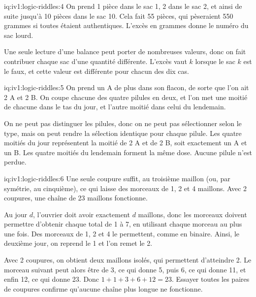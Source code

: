 \begin{solution}{iq:iv1:logic-riddles:4}
On prend 1 pièce dans le sac 1, 2 dans le sac 2, et ainsi de suite jusqu'à 10 pièces dans le sac 10. Cela fait 55 pièces, qui pèseraient 550 grammes si toutes étaient authentiques. L'excès en grammes donne le numéro du sac lourd.

Une seule lecture d'une balance peut porter de nombreuses valeurs, donc on fait contribuer chaque sac d'une quantité différente. L'excès vaut $k$ lorsque le sac $k$ est le faux, et cette valeur est différente pour chacun des dix cas.

\end{solution}

\begin{solution}{iq:iv1:logic-riddles:5}
On prend un A de plus dans son flacon, de sorte que l'on ait 2 A et 2 B. On coupe chacune des quatre pilules en deux, et l'on met une moitié de chacune dans le tas du jour, et l'autre moitié dans celui du lendemain.

On ne peut pas distinguer les pilules, donc on ne peut pas sélectionner selon le type, mais on peut rendre la sélection identique pour chaque pilule. Les quatre moitiés du jour représentent la moitié de 2 A et de 2 B, soit exactement un A et un B. Les quatre moitiés du lendemain forment la même dose. Aucune pilule n'est perdue.

\end{solution}

\begin{solution}{iq:iv1:logic-riddles:6}
Une seule coupure suffit, au troisième maillon (ou, par symétrie, au cinquième), ce qui laisse des morceaux de 1, 2 et 4 maillons. Avec 2 coupures, une chaîne de 23 maillons fonctionne.

Au jour $d$, l'ouvrier doit avoir exactement $d$ maillons, donc les morceaux doivent permettre d'obtenir chaque total de 1 à 7, en utilisant chaque morceau au plus une fois. Des morceaux de 1, 2 et 4 le permettent, comme en binaire. Ainsi, le deuxième jour, on reprend le 1 et l'on remet le 2.

Avec 2 coupures, on obtient deux maillons isolés, qui permettent d'atteindre 2. Le morceau suivant peut alors être de 3, ce qui donne 5, puis 6, ce qui donne 11, et enfin 12, ce qui donne 23. Donc $1 + 1 + 3 + 6 + 12 = 23$. Essayer toutes les paires de coupures confirme qu'aucune chaîne plus longue ne fonctionne.

\end{solution}

